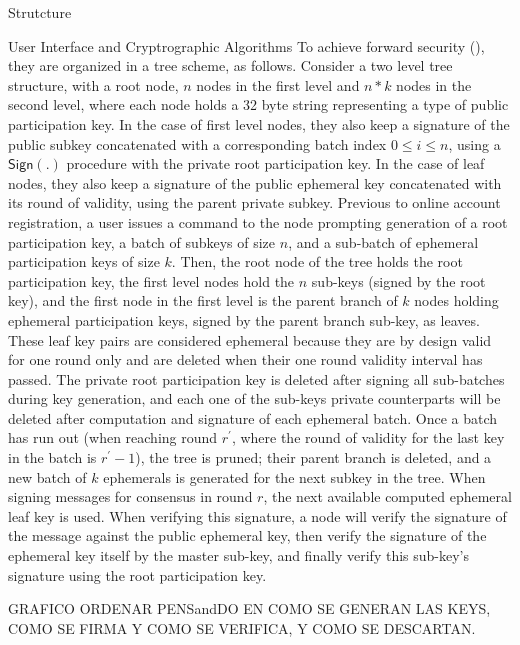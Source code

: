 \documentclass[10pt,a4paper]{article}
\begin{document}
\begin{section}{Strutcture}
\begin{subsection}{User Interface and Cryptrographic Algorithms}
    To achieve forward security (\cite{Gunther:1990}), they are organized in a tree scheme, as follows.
    Consider a two level tree structure, with a root node, $n$ nodes in the first level and $n*k$ nodes in the
    second level, where each node holds a 32 byte string representing a type of public participation key. 
    In the case of first level nodes, they also keep a signature of the public subkey concatenated with 
    a corresponding batch index $0 \leq i \leq n$,
    using a $\mathsf{Sign}(.)$ procedure with the private root participation key.
    In the case of leaf nodes, they also keep a signature of the public ephemeral key concatenated with its round of validity,
    using the parent private subkey.
    Previous to online account registration, a user issues a command to the node prompting generation of a root 
    participation key, a batch of subkeys of size $n$, and a sub-batch of ephemeral participation keys of size $k$.
    Then, the root node of the tree holds the root participation key, the first level nodes hold the $n$ sub-keys
    (signed by the root key), and the first node in the first level is the parent branch of $k$ nodes holding
    ephemeral participation keys, signed by the parent branch sub-key, as leaves.
    These leaf key pairs are considered ephemeral because they are by design valid for one round only and are deleted when their
    one round validity interval has passed.
    The private root participation key is deleted after signing all sub-batches during key generation,
    and each one of the sub-keys private counterparts will be deleted after computation and signature of each ephemeral batch.
    Once a batch has run out (when reaching round $r^\prime$, where the round of validity for the last key in the batch
    is $r^\prime - 1$), the tree is pruned; their parent branch is deleted, and a new batch of $k$ ephemerals
    is generated for the next subkey in the tree.
    When signing messages for consensus in round $r$, the next available computed ephemeral leaf key is used.
    When verifying this signature, a node will verify the signature of the message against the public ephemeral key, 
    then verify the signature of the ephemeral key itself by the master sub-key, and finally verify this sub-key's
    signature using the root participation key.

     GRAFICO ORDENAR PENSandDO EN COMO SE GENERAN LAS KEYS, COMO SE FIRMA Y COMO SE VERIFICA, Y COMO SE DESCARTAN.


\end{subsection}
\end{section}
\end{document}
